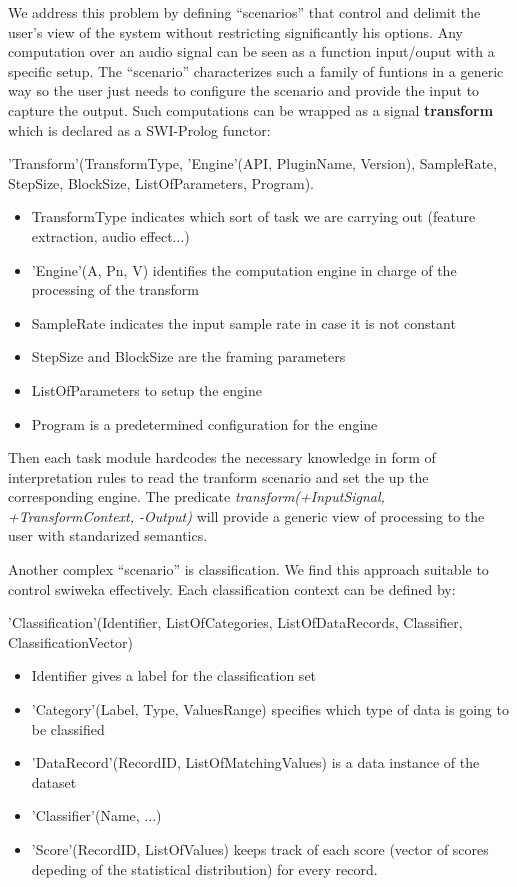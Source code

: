 \documentclass[runningheads]{llncs}
\begin{document}
We address this problem by defining ``scenarios'' that control and delimit the user's view of the system without restricting significantly his options. Any computation over an audio signal can be seen as a function input/ouput with a specific setup. The ``scenario'' characterizes such a family of funtions in a generic way so the user just needs to configure the scenario and provide the input to capture the output. Such computations can be wrapped as a signal \textbf{transform} which is declared as a SWI-Prolog functor:

'Transform'(TransformType, 'Engine'(API, PluginName, Version), SampleRate, StepSize, BlockSize, ListOfParameters, Program).

\begin{itemize}

 \item TransformType indicates which sort of task we are carrying out (feature extraction, audio effect...)
 \item 'Engine'(A, Pn, V) identifies the computation engine in charge of the processing of the transform
 \item SampleRate indicates the input sample rate in case it is not constant
 \item StepSize and BlockSize are the framing parameters
 \item ListOfParameters to setup the engine
 \item Program is a predetermined configuration for the engine
\end{itemize}

Then each task module hardcodes the necessary knowledge in form of interpretation rules to read the tranform scenario and set the up the corresponding engine. The predicate \textit{transform(+InputSignal, +TransformContext, -Output)} will provide a generic view of processing to the user with standarized semantics.

Another complex ``scenario'' is classification. We find this approach suitable to control swiweka effectively. Each classification context can be defined by:

'Classification'(Identifier, ListOfCategories, ListOfDataRecords, Classifier, ClassificationVector)

\begin{itemize}

 \item Identifier gives a label for the classification set
 \item 'Category'(Label, Type, ValuesRange) specifies which type of data is going to be classified
 \item 'DataRecord'(RecordID, ListOfMatchingValues) is a data instance of the dataset 
 \item 'Classifier'(Name, ...)
 \item 'Score'(RecordID, ListOfValues) keeps track of each score (vector of scores depeding of the statistical distribution) for every record.
\end{itemize}
\end{document}
